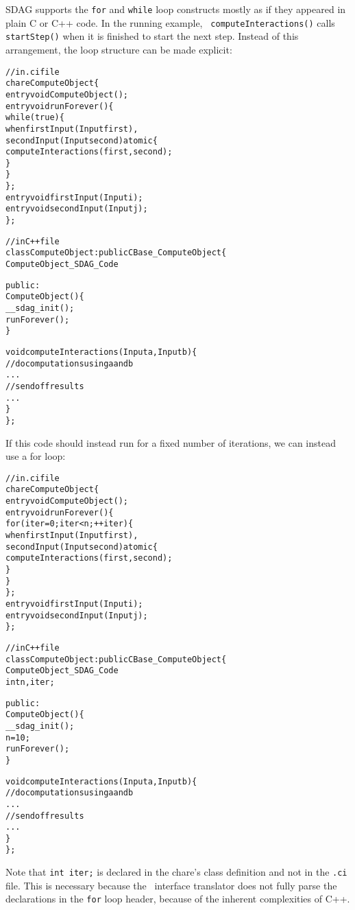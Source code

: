 SDAG supports the {\tt for} and {\tt while} loop constructs mostly as if they
appeared in plain C or C++ code. In the running example, {\tt
  computeInteractions()} calls {\tt startStep()} when it is finished to start
the next step. Instead of this arrangement, the loop structure can be made
explicit:
\begin{center}
\begin{alltt}
// in .ci file
chare ComputeObject \{
  entry void ComputeObject();
  entry void runForever() \{
    while(true) \{
      when firstInput(Input first),
           secondInput(Input second) atomic \{
          computeInteractions(first, second);
      \}
    \}
  \};
  entry void firstInput(Input i);
  entry void secondInput(Input j);
\};

// in C++ file
class ComputeObject : public CBase_ComputeObject \{
  ComputeObject_SDAG_Code

public:
  ComputeObject() \{
    __sdag_init();
    runForever();
  \}

  void computeInteractions(Input a, Input b) \{
    // do computations using a and b
    . . .
    // send off results
    . . .
  \}
\};
\end{alltt}
\end{center}
If this code should instead run for a fixed number of iterations, we can
instead use a for loop:
\begin{center}
\begin{alltt}
// in .ci file
chare ComputeObject \{
  entry void ComputeObject();
  entry void runForever() \{
    for(iter = 0; iter < n; ++iter) \{
      when firstInput(Input first),
           secondInput(Input second) atomic \{
        computeInteractions(first, second);
      \}
    \}
  \};
  entry void firstInput(Input i);
  entry void secondInput(Input j);
\};

// in C++ file
class ComputeObject : public CBase_ComputeObject \{
  ComputeObject_SDAG_Code
  int n, iter;

public:
  ComputeObject() \{
    __sdag_init();
    n = 10;
    runForever();
  \}

  void computeInteractions(Input a, Input b) \{
    // do computations using a and b
    . . .
    // send off results
    . . .
  \}
\};
\end{alltt}
\end{center}
Note that {\tt int iter;} is declared in the chare's class definition and not
in the {\tt .ci} file. This is necessary because the \charmpp\ interface
translator does not fully parse the declarations in the {\tt for} loop header,
because of the inherent complexities of C++.

